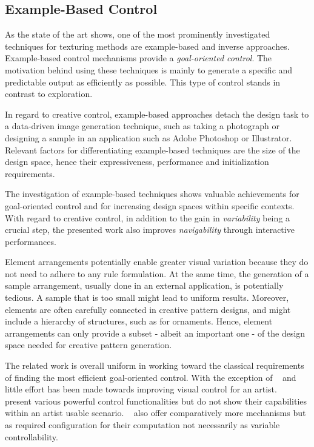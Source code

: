
\subsection{Example-Based Control}
\label{subsubsec:analysis_creative_means_example}

As the state of the art shows, one of the most prominently investigated techniques for texturing methods are example-based and inverse approaches. Example-based control mechanisms provide a \textit{goal-oriented control}. The motivation behind using these techniques is mainly to generate a specific and predictable output as efficiently as possible. This type of control stands in contrast to exploration.

In regard to creative control, example-based approaches detach the design task to a data-driven image generation technique, such as taking a photograph or designing a sample in an application such as Adobe Photoshop or Illustrator. Relevant factors for differentiating example-based techniques are the size of the design space, hence their expressiveness, performance and initialization requirements. 

The investigation of example-based techniques shows valuable achievements for goal-oriented control and for increasing design spaces within specific contexts. With regard to creative control, in addition to the gain in \textit{variability} being a crucial step, the presented work also improves \textit{navigability} through interactive performances.

Element arrangements potentially enable greater visual variation because they do not need to adhere to any rule formulation. At the same time, the generation of a sample arrangement, usually done in an external application, is potentially tedious. A sample that is too small might lead to uniform results. Moreover, elements are often carefully connected in creative pattern designs, and might include a hierarchy of structures, such as for ornaments. Hence, element arrangements can only provide a subset - albeit an important one - of the design space needed for creative pattern generation.

The related work is overall uniform in working toward the classical requirements of finding the most efficient goal-oriented control. With the exception of \citeauthor*{ijiri_2008_aeb}~\cite{ijiri_2008_aeb} and \citeauthor*{galerne_2012_gne}~\cite{galerne_2012_gne} little effort has been made towards improving visual control for an artist. \citeauthor*{ma_2013_det}~\cite{ma_2013_det} present various powerful control functionalities but do not show their capabilities within an artist usable scenario. \citeauthor*{gilet_2012_map}~\cite{gilet_2012_map} also offer comparatively more mechanisms but as required configuration for their computation not necessarily as variable controllability.

